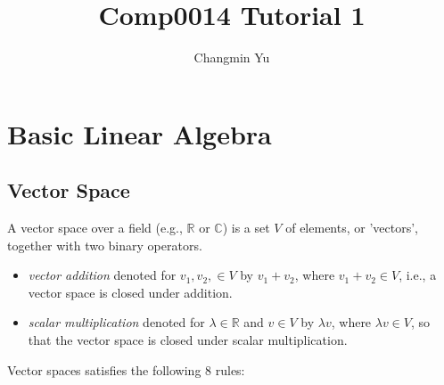 \documentclass[12pt]{article}
\title{Comp0014 Tutorial 1}
\author{Changmin Yu}
\date{}
\begin{document}
\maketitle

\section*{Basic Linear Algebra}
\subsection*{Vector Space}
A vector space over a field (e.g., $\mathbb{R}$ or $\mathbb{C}$) is a set $V$ of elements, or 'vectors', together with two binary operators.
\begin{itemize}
    \item \textit{vector addition} denoted for $v_{1}, v_{2}, \in V$ by $v_{1} + v_{2}$, where $v_{1}+v_{2}\in V$, i.e., a vector space is closed under addition.
    \item \textit{scalar multiplication} denoted for $\lambda\in\mathbb{R}$ and $v\in V$ by $\lambda v$, where $\lambda v\in V$, so that the vector space is closed under scalar multiplication.
\end{itemize}
Vector spaces satisfies the following 8 rules:
\end{document}
